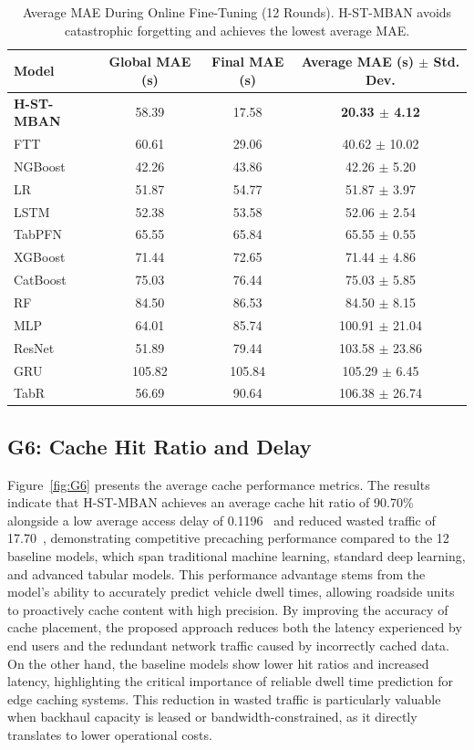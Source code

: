 \documentclass[journal]{IEEEtran}
\begin{document}
\begin{table}[!t]
\centering
\caption{Average MAE During Online Fine-Tuning (12 Rounds). H-ST-MBAN avoids catastrophic forgetting and achieves the lowest average MAE.}
\label{tab:finetune_accuracy}
\begin{tabular}{lccc}
\toprule
\textbf{Model} & \textbf{Global MAE (s)} & \textbf{Final MAE (s)} & \textbf{Average MAE (s) $\pm$ Std. Dev.} \\
\midrule
\textbf{H-ST-MBAN} & 58.39 & 17.58 & \textbf{20.33 $\pm$ 4.12} \\
FTT & 60.61 & 29.06 & 40.62 $\pm$ 10.02 \\
NGBoost & 42.26 & 43.86 & 42.26 $\pm$ 5.20 \\
LR & 51.87 & 54.77 & 51.87 $\pm$ 3.97 \\
LSTM & 52.38 & 53.58 & 52.06 $\pm$ 2.54 \\
TabPFN & 65.55 & 65.84 & 65.55 $\pm$ 0.55 \\
XGBoost & 71.44 & 72.65 & 71.44 $\pm$ 4.86 \\
CatBoost & 75.03 & 76.44 & 75.03 $\pm$ 5.85 \\
RF & 84.50 & 86.53 & 84.50 $\pm$ 8.15 \\
MLP & 64.01 & 85.74 & 100.91 $\pm$ 21.04 \\
ResNet & 51.89 & 79.44 & 103.58 $\pm$ 23.86 \\
GRU & 105.82 & 105.84 & 105.29 $\pm$ 6.45 \\
TabR & 56.69 & 90.64 & 106.38 $\pm$ 26.74 \\
\bottomrule
\end{tabular}
\end{table}

\subsection{G6: Cache Hit Ratio and Delay}
Figure~\ref{fig:G6} presents the average cache performance metrics. The results indicate that H-ST-MBAN achieves an average cache hit ratio of 90.70\% alongside a low average access delay of 0.1196~ and reduced wasted traffic of 17.70~, demonstrating competitive precaching performance compared to the 12 baseline models, which span traditional machine learning, standard deep learning, and advanced tabular models. This performance advantage stems from the model's ability to accurately predict vehicle dwell times, allowing roadside units to proactively cache content with high precision. By improving the accuracy of cache placement, the proposed approach reduces both the latency experienced by end users and the redundant network traffic caused by incorrectly cached data. On the other hand, the baseline models show lower hit ratios and increased latency, highlighting the critical importance of reliable dwell time prediction for edge caching systems. This reduction in wasted traffic is particularly valuable when backhaul capacity is leased or bandwidth-constrained, as it directly translates to lower operational costs.
\end{document}
